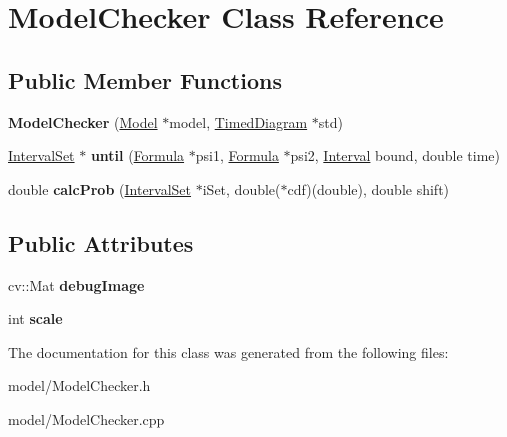 \hypertarget{classModelChecker}{\section{Model\-Checker Class Reference}
\label{classModelChecker}
}
\subsection*{Public Member Functions}
\begin{DoxyCompactItemize}
\item 
\hypertarget{classModelChecker_a83460a37d9257147d4657be1d6ee8856}{{\bfseries Model\-Checker} (\hyperlink{structModel}{Model} $\ast$model, \hyperlink{classTimedDiagram}{Timed\-Diagram} $\ast$std)}\label{classModelChecker_a83460a37d9257147d4657be1d6ee8856}

\item 
\hypertarget{classModelChecker_a7cb62c308e51b561374368e357d252e8}{\hyperlink{classIntervalSet}{Interval\-Set} $\ast$ {\bfseries until} (\hyperlink{classFormula}{Formula} $\ast$psi1, \hyperlink{classFormula}{Formula} $\ast$psi2, \hyperlink{classInterval}{Interval} bound, double time)}\label{classModelChecker_a7cb62c308e51b561374368e357d252e8}

\item 
\hypertarget{classModelChecker_a23059afd44b32e1532da8a235f012dca}{double {\bfseries calc\-Prob} (\hyperlink{classIntervalSet}{Interval\-Set} $\ast$i\-Set, double($\ast$cdf)(double), double shift)}\label{classModelChecker_a23059afd44b32e1532da8a235f012dca}

\end{DoxyCompactItemize}
\subsection*{Public Attributes}
\begin{DoxyCompactItemize}
\item 
\hypertarget{classModelChecker_a5dbb1966925ec7d11656546b4a8f92e8}{cv\-::\-Mat {\bfseries debug\-Image}}\label{classModelChecker_a5dbb1966925ec7d11656546b4a8f92e8}

\item 
\hypertarget{classModelChecker_a70f70a4d5293424da22e04ae1eb59ad6}{int {\bfseries scale}}\label{classModelChecker_a70f70a4d5293424da22e04ae1eb59ad6}

\end{DoxyCompactItemize}


The documentation for this class was generated from the following files\-:\begin{DoxyCompactItemize}
\item 
model/Model\-Checker.\-h\item 
model/Model\-Checker.\-cpp\end{DoxyCompactItemize}
